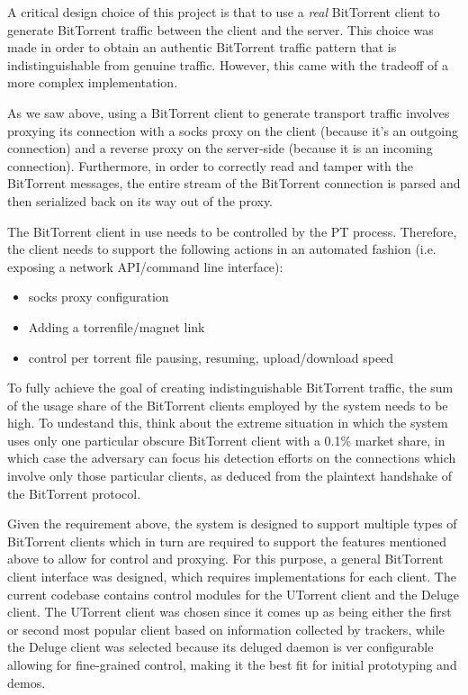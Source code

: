 \documentclass[11pt]{article} %
\begin{document}
A critical design choice of this project is that to use a \textit{real} BitTorrent client to generate BitTorrent traffic between the client and the server. This choice was made in order to obtain an authentic BitTorrent traffic pattern that is indistinguishable from genuine traffic. However, this came with the tradeoff of a more complex implementation.

As we saw above, using a BitTorrent client to generate transport traffic involves proxying its connection with a socks proxy on the client (because it's an outgoing connection) and a reverse proxy on the server-side (because it is an incoming connection). Furthermore, in order to correctly read and tamper with the BitTorrent messages, the entire stream of the BitTorrent connection is parsed and then serialized back on its way out of the proxy. 

 The BitTorrent client in use needs to be controlled by the PT process. Therefore, the client needs to support the following actions in an automated fashion (i.e. exposing a network API/command line interface):

\begin{itemize}
\item socks proxy configuration
\item Adding a torrenfile/magnet link
\item control per torrent file pausing, resuming, upload/download speed
\end{itemize}

To fully achieve the goal of creating indistinguishable BitTorrent traffic, the sum of the usage share of the BitTorrent clients employed by the system needs to be high. To undestand this, think about the extreme situation in which the system uses only one particular obscure BitTorrent client with a 0.1\% market share, in which case the adversary can focus his detection efforts on the connections which involve only those particular clients, as deduced from the plaintext handshake of the BitTorrent protocol.

Given the requirement above, the system is designed to support multiple types of BitTorrent clients which in turn are required to support the features mentioned above to allow for control and proxying. For this purpose, a general BitTorrent client interface was designed, which requires implementations for each client. The current codebase contains control modules for the UTorrent client and the Deluge client. The UTorrent client  was chosen since it comes up as being either the first or second most popular client based on information collected by trackers, while the Deluge client was selected because its deluged daemon is ver configurable allowing for fine-grained control, making it the best fit for initial prototyping and demos. 
\end{document}
